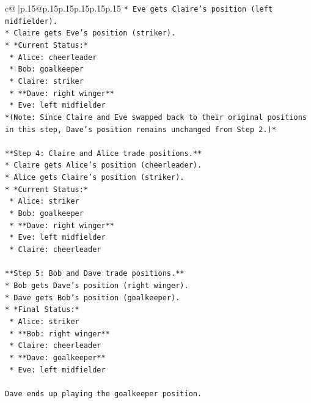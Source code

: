 \documentclass{article}
\begin{document}
{\begin{supertabular}{c@{$\;$}|p{.15\linewidth}@{}p{.15\linewidth}p{.15\linewidth}p{.15\linewidth}p{.15\linewidth}p{.15\linewidth}}
{{{\texttt{*   Eve gets Claire's position (left midfielder).} \\
\texttt{*   Claire gets Eve's position (striker).} \\
\texttt{*   *Current Status:*} \\
\texttt{    *   Alice: cheerleader} \\
\texttt{    *   Bob: goalkeeper} \\
\texttt{    *   Claire: striker} \\
\texttt{    *   **Dave: right winger**} \\
\texttt{    *   Eve: left midfielder} \\
\texttt{*(Note: Since Claire and Eve swapped back to their original positions in this step, Dave's position remains unchanged from Step 2.)*} \\
\\ 
\texttt{**Step 4: Claire and Alice trade positions.**} \\
\texttt{*   Claire gets Alice's position (cheerleader).} \\
\texttt{*   Alice gets Claire's position (striker).} \\
\texttt{*   *Current Status:*} \\
\texttt{    *   Alice: striker} \\
\texttt{    *   Bob: goalkeeper} \\
\texttt{    *   **Dave: right winger**} \\
\texttt{    *   Eve: left midfielder} \\
\texttt{    *   Claire: cheerleader} \\
\\ 
\texttt{**Step 5: Bob and Dave trade positions.**} \\
\texttt{*   Bob gets Dave's position (right winger).} \\
\texttt{*   Dave gets Bob's position (goalkeeper).} \\
\texttt{*   *Final Status:*} \\
\texttt{    *   Alice: striker} \\
\texttt{    *   **Bob: right winger**} \\
\texttt{    *   Claire: cheerleader} \\
\texttt{    *   **Dave: goalkeeper**} \\
\texttt{    *   Eve: left midfielder} \\
\\ 
\texttt{Dave ends up playing the goalkeeper position.} \\
}}}
\end{supertabular}}
\end{document}
